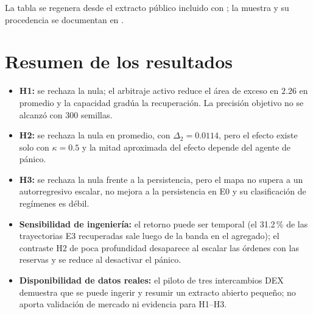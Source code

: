 La tabla se regenera desde el extracto público incluido con ; la muestra y su procedencia se documentan en .

\section{Resumen de los resultados}

\begin{itemize}
  \item \textbf{H1:} se rechaza la nula; el arbitraje activo reduce el área de exceso en $2.26$ en promedio y la capacidad gradúa la recuperación. La precisión objetivo no se alcanzó con 300 semillas.
  \item \textbf{H2:} se rechaza la nula en promedio, con $\Delta_2=0.0114$, pero el efecto existe solo con $\kappa=0.5$ y la mitad aproximada del efecto depende del agente de pánico.
  \item \textbf{H3:} se rechaza la nula frente a la persistencia, pero el mapa no supera a un autorregresivo escalar, no mejora a la persistencia en E0 y su clasificación de regímenes es débil.
  \item \textbf{Sensibilidad de ingeniería:} el retorno puede ser temporal (el 31.2\,\% de las trayectorias E3 recuperadas sale luego de la banda en el agregado); el contraste H2 de poca profundidad desaparece al escalar las órdenes con las reservas y se reduce al desactivar el pánico.
  \item \textbf{Disponibilidad de datos reales:} el piloto de tres intercambios DEX demuestra que se puede ingerir y resumir un extracto abierto pequeño; no aporta validación de mercado ni evidencia para H1--H3.
\end{itemize}
